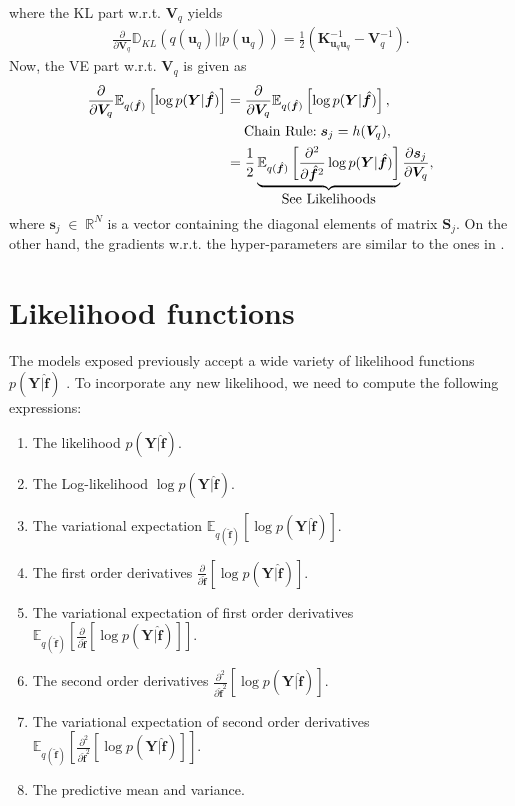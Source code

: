 \documentclass[9pt]{article}
\providecommand{\ve}[1]{{\bm{#1}}}%
\providecommand{\mat}[1]{{\bm{#1}}} %
\newcommand{\Real}{\mathbb{R}}
\DeclareMathOperator{\en}{\!\,\in\!\,}
\providecommand{\ve}[1]{{\mathbf{#1}}}
\providecommand{\mat}[1]{{\mathbf{#1}}}
\newcommand{\fracpartial}[2]{\frac{\partial #1}{\partial  #2}} %
\begin{document}
where the KL part w.r.t. $\mat{V}_q$ yields
\begin{align*}
\fracpartial{}{\mat{V}_q}{\mathbb{D}_{KL}(q(\ve{u}_q)||p(\ve{u}_q))} = \frac{1}{2}\left(\mat{K}_{\ve{u}_q\ve{u}_q}^{-1} - \mat{V}_q^{-1} \right).
\end{align*}
Now, the VE part w.r.t. $\mat{V}_q$ is given as 
\begin{align}
\notag\fracpartial{}{\mat{V}_q}\mathbb{E}_{q(\hat{\ve{f}})}\left[\log p(\mat{Y}|\hat{\ve{f}})\right] &= \fracpartial{}{\mat{V}_q}\mathbb{E}_{q(\hat{\ve{f}})}\left[\log p(\mat{Y}|\hat{\ve{f}})\right],\\
\notag &\quad\;\mbox{Chain Rule:}\;\ve{s}_j=h(\mat{V}_q),\\
&= \frac{1}{2}\underbrace{\mathbb{E}_{q(\hat{\ve{f}})}\left[\fracpartial{^2}{\hat{\ve{f}}^2}\log p(\mat{Y}|\hat{\ve{f}})\right]}_{\mbox{See Likelihoods}} \fracpartial{\ve{s}_j}{\mat{V}_q},
\end{align}
where $\ve{s}_j\en \Real^{N}$ is a vector containing the diagonal elements of matrix $\mat{S}_j$. On the other hand, the gradients w.r.t. the hyper-parameters are similar to the ones in \cite{moreno2018heterogeneous}. 
\section{Likelihood functions}\label{sec:LikeliFunc}
The models exposed previously accept a wide variety of likelihood functions $p(\mat{Y}|\hat{\ve{f}})$ \citep{saul2016chained}. To incorporate any new likelihood, we need to compute the following expressions:
\begin{enumerate}
	\item The likelihood $ p(\mat{Y}|\hat{\ve{f}})$.
	\item The Log-likelihood $\log p(\mat{Y}|\hat{\ve{f}})$.
	\item The variational expectation $\mathbb{E}_{q(\hat{\ve{f}})}\left[\log p(\mat{Y}|\hat{\ve{f}})\right]$.
	\item The first order derivatives $\fracpartial{}{\hat{\ve{f}}}\left[\log p(\mat{Y}|\hat{\ve{f}})\right]$.
	\item The variational expectation of first order derivatives $\mathbb{E}_{q(\hat{\ve{f}})}\left[\fracpartial{}{\hat{\ve{f}}}\left[\log p(\mat{Y}|\hat{\ve{f}})\right]\right]$.
	\item The second order derivatives $\fracpartial{^2}{\hat{\ve{f}}^2}\left[\log p(\mat{Y}|\hat{\ve{f}})\right]$.
	\item The variational expectation of second order derivatives $\mathbb{E}_{q(\hat{\ve{f}})}\left[\fracpartial{^2}{\hat{\ve{f}}^2}\left[\log p(\mat{Y}|\hat{\ve{f}})\right]\right]$.
	\item The predictive mean and variance.
\end{enumerate}
\end{document}
